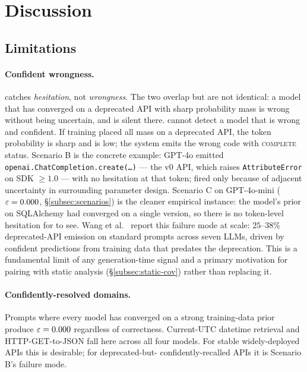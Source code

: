 \section{Discussion}
\label{sec:discussion}

\subsection{Limitations}
\label{subsec:limitations}

\paragraph{Confident wrongness.} \eps catches \emph{hesitation}, not
\emph{wrongness}. The two overlap but are not identical: a model that
has converged on a deprecated API with sharp probability mass is
wrong without being uncertain, and \eps is silent there. \eps cannot
detect a model that is wrong and confident. If training placed all
mass on a deprecated API, the token probability is sharp and \eps is
low; the system emits the wrong code with \textsc{complete} status. Scenario B is the
concrete example: GPT-4o emitted
\texttt{openai.ChatCompletion.create(\ldots)} --- the v0 API, which
raises \texttt{AttributeError} on SDK $\ge 1.0$ --- with no
hesitation at that token; \eps fired only because of adjacent
uncertainty in surrounding parameter design. Scenario C on
GPT-4o-mini ($\varepsilon = 0.000$, \S\ref{subsec:scenarios}) is the cleaner
empirical instance: the model's prior on SQLAlchemy had converged
on a single version, so there is no token-level hesitation for
\eps to see. Wang et al.~\cite{wang2025deprecated} report this
failure mode at scale: $25$--$38\%$ deprecated-API emission on
standard prompts across seven LLMs, driven by confident predictions
from training data that predates the deprecation. This is a
fundamental limit of any generation-time signal and a primary
motivation for pairing \eps with static analysis
(\S\ref{subsec:static-cov}) rather than replacing it.

\paragraph{Confidently-resolved domains.} Prompts where every model
has converged on a strong training-data prior produce $\varepsilon = 0.000$
regardless of correctness. Current-UTC datetime retrieval and
HTTP-GET-to-JSON fall here across all four models. For stable
widely-deployed APIs this is desirable; for deprecated-but-%
confidently-recalled APIs it is Scenario B's failure mode.

